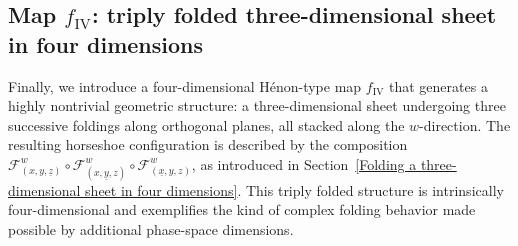 \documentclass[12pt]{iopart}
\begin{document}
\subsection{Map \( f_{\mathrm{IV}} \): triply folded three-dimensional sheet in four dimensions}
\label{f IV}

Finally, we introduce a four-dimensional Hénon-type map \( f_{\mathrm{IV}} \) that generates a highly nontrivial geometric structure: a three-dimensional sheet undergoing three successive foldings along orthogonal planes, all stacked along the \( w \)-direction. The resulting horseshoe configuration is described by the composition \( \mathcal{F}^w_{(x,y,\underline{z})} \circ \mathcal{F}^w_{(x,\underline{y},z)} \circ \mathcal{F}^w_{(\underline{x},y,z)} \), as introduced in Section~\ref{Folding a three-dimensional sheet in four dimensions}. This triply folded structure is intrinsically four-dimensional and exemplifies the kind of complex folding behavior made possible by additional phase-space dimensions.
\end{document}
